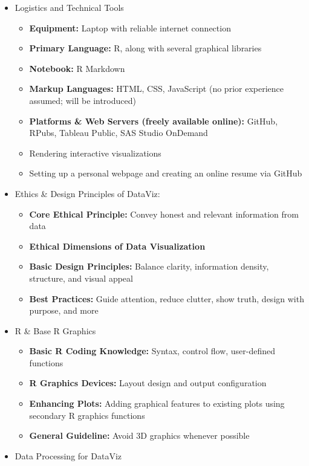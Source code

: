 \documentclass[
]{article}
\providecommand{\tightlist}{%
  \setlength{\itemsep}{0pt}\setlength{\parskip}{0pt}}
\begin{document}
\begin{itemize}
\tightlist
\item
  Logistics and Technical Tools

  \begin{itemize}
  \tightlist
  \item
    \textbf{Equipment:} Laptop with reliable internet connection
  \item
    \textbf{Primary Language:} R, along with several graphical libraries
  \item
    \textbf{Notebook:} R Markdown
  \item
    \textbf{Markup Languages:} HTML, CSS, JavaScript (no prior
    experience assumed; will be introduced)
  \item
    \textbf{Platforms \& Web Servers (freely available online):} GitHub,
    RPubs, Tableau Public, SAS Studio OnDemand
  \item
    Rendering interactive visualizations
  \item
    Setting up a personal webpage and creating an online resume via
    GitHub
  \end{itemize}
\item
  Ethics \& Design Principles of DataViz:

  \begin{itemize}
  \tightlist
  \item
    \textbf{Core Ethical Principle:} Convey honest and relevant
    information from data
  \item
    \textbf{Ethical Dimensions of Data Visualization}
  \item
    \textbf{Basic Design Principles:} Balance clarity, information
    density, structure, and visual appeal
  \item
    \textbf{Best Practices:} Guide attention, reduce clutter, show
    truth, design with purpose, and more
  \end{itemize}
\item
  R \& Base R Graphics

  \begin{itemize}
  \tightlist
  \item
    \textbf{Basic R Coding Knowledge:} Syntax, control flow,
    user-defined functions
  \item
    \textbf{R Graphics Devices:} Layout design and output configuration
  \item
    \textbf{Enhancing Plots:} Adding graphical features to existing
    plots using secondary R graphics functions
  \item
    \textbf{General Guideline:} Avoid 3D graphics whenever possible
  \end{itemize}
\item
  Data Processing for DataViz


\end{itemize}
\end{document}
